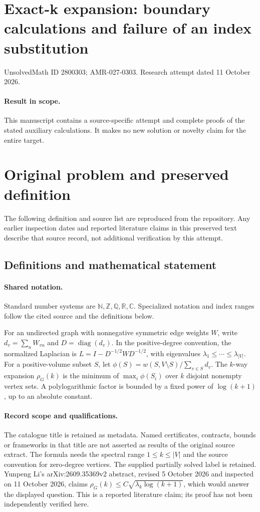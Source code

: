 \documentclass[11pt]{article}
\begin{document}
\section*{Exact-k expansion: boundary calculations and failure of an index substitution}
\noindent UnsolvedMath ID 2800303; AMR-027-0303. Research attempt dated 11 October 2026.
\paragraph{Result in scope.}This manuscript contains a source-specific attempt and complete proofs of the stated auxiliary calculations. It makes no new solution or novelty claim for the entire target.
\section{Original problem and preserved definition}
The following definition and source list are reproduced from the repository. Any earlier inspection dates and reported literature claims in this preserved text describe that source record, not additional verification by this attempt.
\subsection{Definitions and mathematical statement}

\paragraph{Shared notation.}Standard number systems are $\mathbb N,\mathbb Z,\mathbb Q,\mathbb R,\mathbb C$. Specialized notation and index ranges follow the cited source and the definitions below.


For an undirected graph with nonnegative symmetric edge weights $W$, write $d_v=\sum_uW_{vu}$ and $D=\operatorname{diag}(d_v)$. In the positive-degree convention, the normalized Laplacian is $L=I-D^{-1/2}WD^{-1/2}$, with eigenvalues $\lambda_1\leq\cdots\leq\lambda_{|V|}$. For a positive-volume subset $S$, let $\phi(S)=w(S,V\setminus S)/\sum_{v\in S}d_v$. The $k$-way expansion $\rho_G(k)$ is the minimum of $\max_i\phi(S_i)$ over $k$ disjoint nonempty vertex sets. A polylogarithmic factor is bounded by a fixed power of $\log(k+1)$, up to an absolute constant.
\paragraph{Record scope and qualifications.}
The catalogue title is retained as metadata. Named certificates, contracts, bounds or frameworks in that title are not asserted as results of the original source extract.
The formula needs the spectral range $1\leq k\leq|V|$ and the source convention for zero-degree vertices. The supplied partially solved label is retained. Yunpeng Li's arXiv:2609.35369v2 abstract, revised 5 October 2026 and inspected on 11 October 2026, claims $\rho_G(k)\leq C\sqrt{\lambda_k\log(k+1)}$, which would answer the displayed question. This is a reported literature claim; its proof has not been independently verified here.
\end{document}
